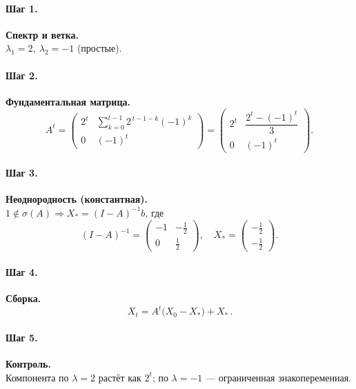 \paragraph{Шаг 1.} \textbf{Спектр и ветка.}\\
\(\lambda_1=2,\ \lambda_2=-1\) (простые).

\paragraph{Шаг 2.} \textbf{Фундаментальная матрица.}\\
\[
A^t=
\begin{pmatrix}
2^t & \displaystyle\sum_{k=0}^{t-1}2^{\,t-1-k}(-1)^k\\[6pt]
0 & (-1)^t
\end{pmatrix}
=
\begin{pmatrix}
2^t & \dfrac{2^t-(-1)^t}{3}\\[6pt]
0 & (-1)^t
\end{pmatrix}.
\]

\paragraph{Шаг 3.} \textbf{Неоднородность (константная).}\\
\(1\notin\sigma(A)\Rightarrow X_*=(I-A)^{-1}b\), где
\[
(I-A)^{-1}=\begin{pmatrix}-1&-\tfrac12\\[2pt]0&\tfrac12\end{pmatrix},\quad
X_*=\begin{pmatrix}-\tfrac12\\[2pt]-\tfrac12\end{pmatrix}.
\]

\paragraph{Шаг 4.} \textbf{Сборка.}\\
\[
\boxed{\,X_t=A^t\bigl(X_0-X_*\bigr)+X_*\,}.
\]

\paragraph{Шаг 5.} \textbf{Контроль.}\\
Компонента по \(\lambda=2\) растёт как \(2^t\); по \(\lambda=-1\) — ограниченная знакопеременная.

